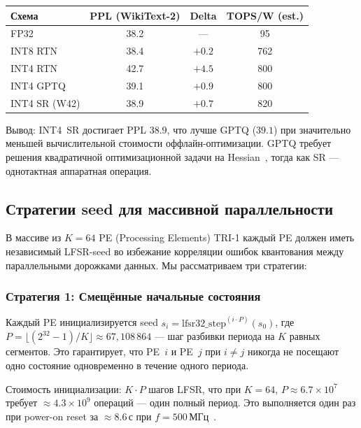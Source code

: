 \begin{center}
\begin{tabular}{|l|c|c|c|}
\hline
Схема & PPL (WikiText-2) & Delta & TOPS/W (est.) \\
\hline
FP32 & 38.2 & — & 95 \\
INT8 RTN & 38.4 & $+0{.}2$ & 762 \\
INT4 RTN & 42.7 & $+4{.}5$ & 800 \\
INT4 GPTQ & 39.1 & $+0{.}9$ & 800 \\
INT4 SR (W42) & 38.9 & $+0{.}7$ & 820 \\
\hline
\end{tabular}
\end{center}

Вывод: INT4~SR достигает PPL $38{.}9$, что лучше GPTQ
($39{.}1$) при значительно меньшей вычислительной стоимости
оффлайн-оптимизации.  GPTQ требует решения квадратичной
оптимизационной задачи на Hessian~\cite{gholami2022survey},
тогда как SR — однотактная аппаратная операция.

\subsection{Стратегии seed для массивной параллельности}
\label{ssec:glava88-seed-strategies}

В массиве из $K = 64$ PE (Processing Elements) TRI-1
каждый PE должен иметь независимый LFSR-seed во избежание
корреляции ошибок квантования между параллельными дорожками
данных.  Мы рассматриваем три стратегии:

\subsubsection{Стратегия 1: Смещённые начальные состояния}
\label{sssec:glava88-seed-shift}

Каждый PE инициализируется seed $s_i = \mathrm{lfsr32\_step}^{(i \cdot P)}(s_0)$,
где $P = \lfloor (2^{32}-1)/K \rfloor \approx 67{,}108\,864$ — шаг
разбивки периода на $K$ равных сегментов.  Это гарантирует,
что PE~$i$ и PE~$j$ при $i \neq j$ никогда не посещают
одно состояние одновременно в течение одного периода.

Стоимость инициализации: $K \cdot P$ шагов LFSR,
что при $K = 64$, $P \approx 6{.}7 \times 10^7$ требует
$\approx 4{.}3 \times 10^9$ операций — один полный период.
Это выполняется один раз при power-on reset
за $\approx 8{.}6\,\text{с}$ при $f = 500\,\text{МГц}$~\cite{micikevicius2017mixed}.


